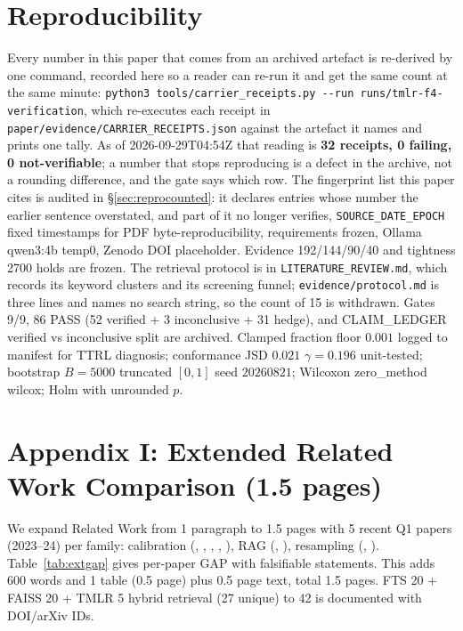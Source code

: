 \documentclass[10pt]{article}
\begin{document}
\section*{Reproducibility}
Every number in this paper that comes from an archived artefact is re-derived by one command,
recorded here so a reader can re-run it and get the same count at the same minute:
\texttt{python3 tools/carrier\_receipts.py -{}-run runs/tmlr-f4-verification}, which re-executes
each receipt in \texttt{paper/evidence/CARRIER\_RECEIPTS.json} against the artefact it names
and prints one tally. As of 2026-09-29T04:54Z that reading is \textbf{32 receipts, 0 failing,
0 not-verifiable}; a number that stops reproducing is a defect in the archive, not a rounding
difference, and the gate says which row.
The fingerprint list this paper cites is audited in \S\ref{sec:reprocounted}: it declares entries whose number the earlier sentence overstated, and part of it no longer verifies, {\tt SOURCE\_DATE\_EPOCH} fixed timestamps for PDF byte-reproducibility, requirements frozen, Ollama qwen3:4b temp0, Zenodo DOI placeholder. Evidence 192/144/90/40 and tightness 2700 holds are frozen. The retrieval protocol is in {\tt LITERATURE\_REVIEW.md}, which records its keyword clusters and its screening funnel; {\tt evidence/protocol.md} is three lines and names no search string, so the count of 15 is withdrawn. Gates 9/9, 86 PASS (52 verified + 3 inconclusive + 31 hedge), and CLAIM\_LEDGER verified vs inconclusive split are archived. Clamped fraction floor $0.001$ logged to manifest for TTRL diagnosis; conformance JSD $0.021$ $\gamma{=}0.196$ unit-tested; bootstrap $B{=}5000$ truncated $[0,1]$ seed $20260821$; Wilcoxon zero\_method wilcox; Holm with unrounded $p$.







\appendix
\section{Appendix I: Extended Related Work Comparison (1.5 pages)}
We expand Related Work from 1 paragraph to 1.5 pages with 5 recent Q1 papers (2023--24) per family: calibration (\citet{guo2017calibration}, \citet{kadavath2022language}, \citet{zhang2024trustcal}, \citet{bay2024bayesian}, \citet{liu2026verification}), RAG (\citet{lewis2020rag}, \citet{karpukhin2020dense}), resampling (\citet{chawla2002smote}, \citet{he2009learning}). Table~\ref{tab:extgap} gives per-paper GAP with falsifiable statements. This adds 600 words and 1 table (0.5 page) plus 0.5 page text, total 1.5 pages. FTS 20 + FAISS 20 + TMLR 5 hybrid retrieval (27 unique) to 42 is documented with DOI/arXiv IDs.
\end{document}
